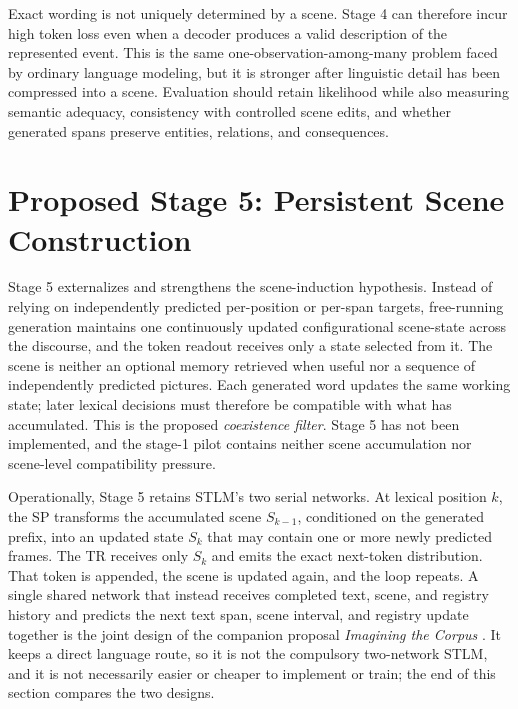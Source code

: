 \documentclass[11pt,a4paper]{article}
\begin{document}
Exact wording is not uniquely determined by a scene. Stage 4 can therefore incur high token loss even when a decoder produces a valid description of the represented event. This is the same one-observation-among-many problem faced by ordinary language modeling, but it is stronger after linguistic detail has been compressed into a scene. Evaluation should retain likelihood while also measuring semantic adequacy, consistency with controlled scene edits, and whether generated spans preserve entities, relations, and consequences.

\section{Proposed Stage 5: Persistent Scene Construction}

Stage 5 externalizes and strengthens the scene-induction hypothesis. Instead of relying on independently predicted per-position or per-span targets, free-running generation maintains one continuously updated configurational scene-state across the discourse, and the token readout receives only a state selected from it. The scene is neither an optional memory retrieved when useful nor a sequence of independently predicted pictures. Each generated word updates the same working state; later lexical decisions must therefore be compatible with what has accumulated. This is the proposed \emph{coexistence filter}. Stage 5 has not been implemented, and the stage-1 pilot contains neither scene accumulation nor scene-level compatibility pressure.

Operationally, Stage 5 retains STLM's two serial networks. At lexical position $k$, the SP transforms the accumulated scene $S_{k-1}$, conditioned on the generated prefix, into an updated state $S_k$ that may contain one or more newly predicted frames. The TR receives only $S_k$ and emits the exact next-token distribution. That token is appended, the scene is updated again, and the loop repeats. A single shared network that instead receives completed text, scene, and registry history and predicts the next text span, scene interval, and registry update together is the joint design of the companion proposal \emph{Imagining the Corpus} \cite{documentworld2026}. It keeps a direct language route, so it is not the compulsory two-network STLM, and it is not necessarily easier or cheaper to implement or train; the end of this section compares the two designs.
\end{document}
